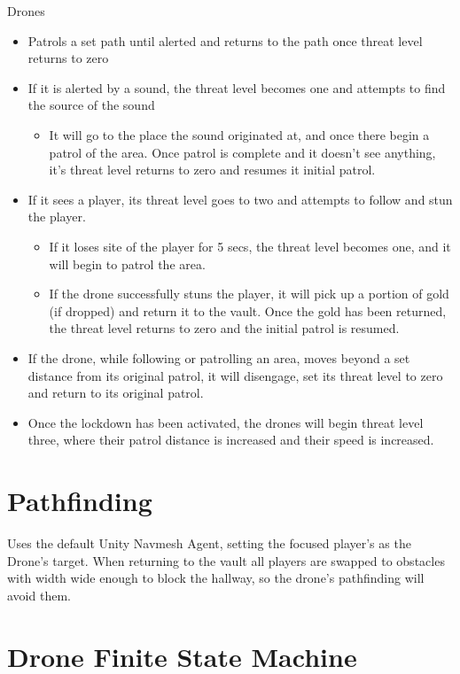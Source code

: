 \documentclass[10pt]{report}
\begin{document}
Drones

\begin{itemize}
    \item Patrols a set path until alerted and returns to the path once threat level returns to zero
    \item If it is alerted by a sound, the threat level becomes one and attempts to find the source of the sound
    \begin{itemize}
        \item It will go to the place the sound originated at, and once there begin a patrol of the area. Once patrol is complete and it doesn’t see anything, it’s threat level returns to zero and resumes it initial patrol.
    \end{itemize}
    \item If it sees a player, its threat level goes to two and attempts to follow and stun the player.
    \begin{itemize}
        \item If it loses site of the player for 5 secs, the threat level becomes one, and it will begin to patrol the area.
        \item If the drone successfully stuns the player, it will pick up a portion of gold (if dropped) and return it to the vault. Once the gold has been returned, the threat level returns to zero and the initial patrol is resumed.
    \end{itemize}
    \item If the drone, while following or patrolling an area, moves beyond a set distance from its original patrol, it will disengage, set its threat level to zero and return to its original patrol.
    \item Once the lockdown has been activated, the drones will begin threat level three, where their patrol distance is increased and their speed is increased.    
\end{itemize}

\section{Pathfinding}

Uses the default Unity Navmesh Agent, setting the focused player’s as the Drone’s target. When returning to the vault all players are swapped to obstacles with width wide enough to block the hallway, so the drone’s pathfinding will avoid them.

\section{Drone Finite State Machine}
\end{document}
